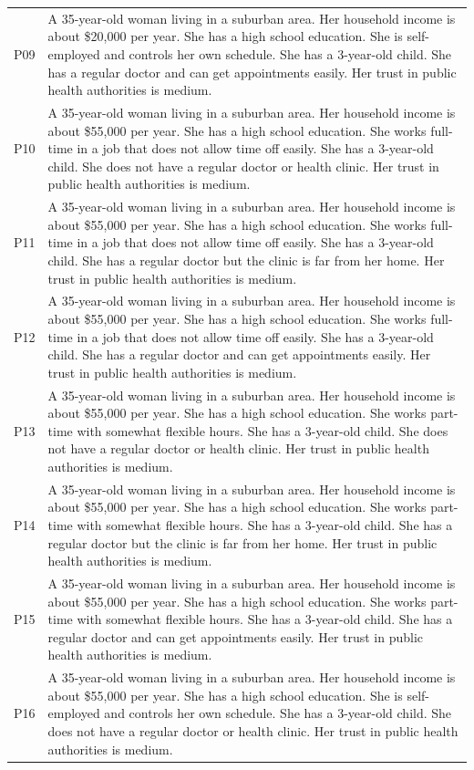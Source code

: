 \begin{longtable}{p{1.2cm}p{12cm}}
P09 & A 35-year-old woman living in a suburban area. Her household income is about \$20,000 per year. She has a high school education. She is self-employed and controls her own schedule. She has a 3-year-old child. She has a regular doctor and can get appointments easily. Her trust in public health authorities is medium. \\
P10 & A 35-year-old woman living in a suburban area. Her household income is about \$55,000 per year. She has a high school education. She works full-time in a job that does not allow time off easily. She has a 3-year-old child. She does not have a regular doctor or health clinic. Her trust in public health authorities is medium. \\
P11 & A 35-year-old woman living in a suburban area. Her household income is about \$55,000 per year. She has a high school education. She works full-time in a job that does not allow time off easily. She has a 3-year-old child. She has a regular doctor but the clinic is far from her home. Her trust in public health authorities is medium. \\
P12 & A 35-year-old woman living in a suburban area. Her household income is about \$55,000 per year. She has a high school education. She works full-time in a job that does not allow time off easily. She has a 3-year-old child. She has a regular doctor and can get appointments easily. Her trust in public health authorities is medium. \\
P13 & A 35-year-old woman living in a suburban area. Her household income is about \$55,000 per year. She has a high school education. She works part-time with somewhat flexible hours. She has a 3-year-old child. She does not have a regular doctor or health clinic. Her trust in public health authorities is medium. \\
P14 & A 35-year-old woman living in a suburban area. Her household income is about \$55,000 per year. She has a high school education. She works part-time with somewhat flexible hours. She has a 3-year-old child. She has a regular doctor but the clinic is far from her home. Her trust in public health authorities is medium. \\
P15 & A 35-year-old woman living in a suburban area. Her household income is about \$55,000 per year. She has a high school education. She works part-time with somewhat flexible hours. She has a 3-year-old child. She has a regular doctor and can get appointments easily. Her trust in public health authorities is medium. \\
P16 & A 35-year-old woman living in a suburban area. Her household income is about \$55,000 per year. She has a high school education. She is self-employed and controls her own schedule. She has a 3-year-old child. She does not have a regular doctor or health clinic. Her trust in public health authorities is medium. \\

\end{longtable}
